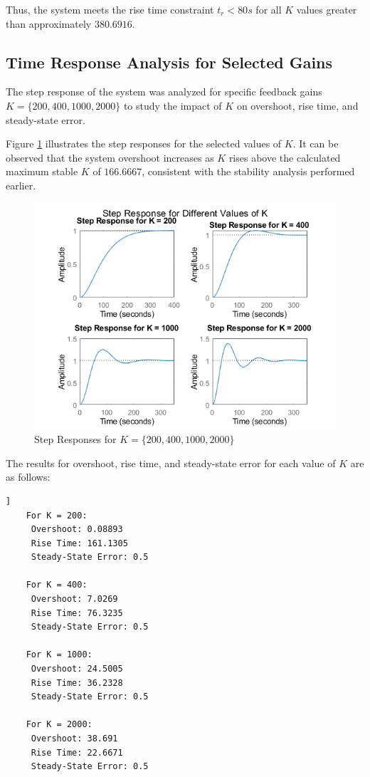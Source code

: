 \documentclass[a4paper, 12pt, english]{article}
\begin{document}
Thus, the system meets the rise time constraint $ {{t}_{r}} < {80s} $ for all $K$ values greater than approximately $380.6916$.

\subsection{Time Response Analysis for Selected Gains} \label{sec:time response analysis for selected gains}
The step response of the system was analyzed for specific feedback gains $ {K} = {\{ 200, 400, 1000, 2000 \}} $ to study the impact of $K$ on overshoot, rise time, and steady-state error.



Figure \ref{fig:Step Response} illustrates the step responses for the selected values of $K$. It can be observed that the system overshoot increases as $K$ rises above the calculated maximum stable $K$ of $166.6667$, consistent with the stability analysis performed earlier.

\begin{figure}[H]
    \centering
    \includegraphics[width=0.8\linewidth]{report/images/stepResponse.png}
    \caption{Step Responses for $ {K} = {\{ 200, 400, 1000, 2000 \}} $}
    \label{fig:Step Response}
\end{figure}

The results for overshoot, rise time, and steady-state error for each value of $K$ are as follows:

\begin{lstlisting}[style=commandstyle,caption=Command line output]]
    For K = 200:
     Overshoot: 0.08893
     Rise Time: 161.1305
     Steady-State Error: 0.5
     
    For K = 400:
     Overshoot: 7.0269
     Rise Time: 76.3235
     Steady-State Error: 0.5
     
    For K = 1000:
     Overshoot: 24.5005
     Rise Time: 36.2328
     Steady-State Error: 0.5
     
    For K = 2000:
     Overshoot: 38.691
     Rise Time: 22.6671
     Steady-State Error: 0.5
\end{lstlisting}
\end{document}

